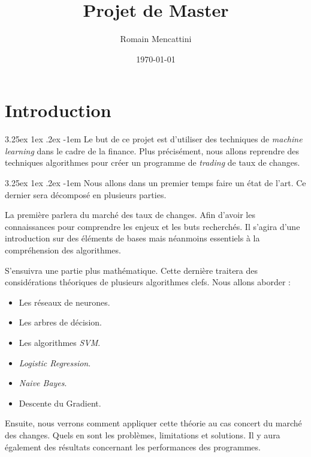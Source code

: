 \documentclass[a4paper, 11pt]{article}
\title{Projet de Master}
\author{Romain Mencattini}
\date{\today}
\makeatletter
\renewcommand\paragraph{\@startsection{paragraph}{5}{\z@}%
  {3.25ex \@plus1ex \@minus.2ex}%
  {-1em}%
  {\normalfont\normalsize\bfseries}}
\makeatother
\begin{document}
\maketitle
\newpage
\tableofcontents
\newpage

\section{Introduction}

\paragraph{}
Le but de ce projet est d'utiliser des techniques de \textit{machine learning} dans le cadre de la finance. Plus précisément, 
nous allons reprendre des techniques algorithmes pour créer un programme de \textit{trading} de taux de changes.

\paragraph{}
Nous allons dans un premier temps faire un état de l'art. Ce dernier sera décomposé en
plusieurs parties.

La première parlera du marché des taux de changes. Afin d'avoir les connaissances pour comprendre les enjeux et les buts recherchés.
Il s'agira d'une introduction sur des éléments de bases mais néanmoins essentiels à la compréhension des algorithmes.

S'ensuivra une partie plus mathématique. Cette dernière traitera des considérations théoriques de plusieurs algorithmes clefs.
Nous allons aborder :
\begin{itemize}
\item Les réseaux de neurones.
\item Les arbres de décision.
\item Les algorithmes \textit{SVM}.
\item \textit{Logistic Regression}.
\item \textit{Naive Bayes}.
\item Descente du Gradient.
\end{itemize}

Ensuite, nous verrons comment appliquer cette théorie au cas concert du marché des changes. Quels en sont les problèmes, limitations
et solutions. Il y aura également des résultats concernant les performances des programmes.
\end{document}
